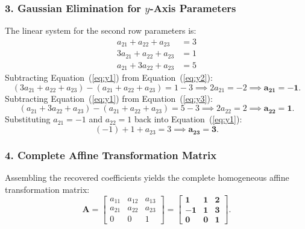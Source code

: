 \documentclass[11pt,a4paper]{article}
\begin{document}
\subsubsection{3. Gaussian Elimination for $y$-Axis Parameters}
The linear system for the second row parameters is:
\begin{align}
a_{21} + a_{22} + a_{23} &= 3 \label{eq:y1} \\
3a_{21} + a_{22} + a_{23} &= 1 \label{eq:y2} \\
a_{21} + 3a_{22} + a_{23} &= 5 \label{eq:y3}
\end{align}
Subtracting Equation~(\ref{eq:y1}) from Equation~(\ref{eq:y2}):
\begin{equation}
(3a_{21} + a_{22} + a_{23}) - (a_{21} + a_{22} + a_{23}) = 1 - 3 \implies 2a_{21} = -2 \implies \mathbf{a_{21} = -1}.
\end{equation}
Subtracting Equation~(\ref{eq:y1}) from Equation~(\ref{eq:y3}):
\begin{equation}
(a_{21} + 3a_{22} + a_{23}) - (a_{21} + a_{22} + a_{23}) = 5 - 3 \implies 2a_{22} = 2 \implies \mathbf{a_{22} = 1}.
\end{equation}
Substituting $a_{21} = -1$ and $a_{22} = 1$ back into Equation~(\ref{eq:y1}):
\begin{equation}
(-1) + 1 + a_{23} = 3 \implies \mathbf{a_{23} = 3}.
\end{equation}

\subsubsection{4. Complete Affine Transformation Matrix}
Assembling the recovered coefficients yields the complete homogeneous affine transformation matrix:
\begin{equation}
\mathbf{A} = \begin{bmatrix} a_{11} & a_{12} & a_{13} \\ a_{21} & a_{22} & a_{23} \\ 0 & 0 & 1 \end{bmatrix} = \mathbf{\begin{bmatrix} 1 & 1 & 2 \\ -1 & 1 & 3 \\ 0 & 0 & 1 \end{bmatrix}}.
\end{equation}
\end{document}
